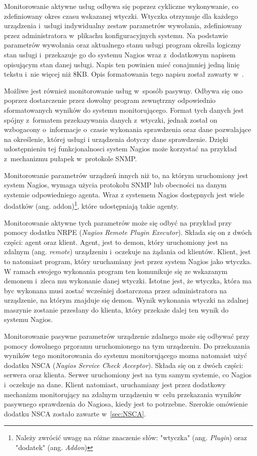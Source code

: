 Monitorowanie aktywne usług odbywa się poprzez cykliczne wykonywanie,
co zdefiniowany okres czasu wskazanej wtyczki. Wtyczka otrzymuje dla
każdego urządzenia i~usługi indywidualny zestaw parametrów wywołania,
zdefiniowany przez administratora w~plikachu konfiguracyjnych
systemu. Na podstawie parametrów wywołania oraz aktualnego stanu
usługi program określa logiczny stan usługi i~przekazuje go do systemu
Nagios wraz z~dodatkowym napisem opisującym stan danej usługi. Napis
ten powinien mieć conajmniej jedną linię tekstu i~nie więcej niż
8KB. Opis formatowania tego napisu został zawarty
w~\cite{www:NagiosPluginsTutorial}. 

Możliwe jest również monitorowanie usług w~sposób pasywny. Odbywa się
ono poprzez dostarczenie przez dowolny program zewnętrzny odpowiednio
sformatowanych wyników do systemu monitorującego. Format tych danych
jest spójny z~formatem przekazywania danych z~wtyczki, jednak został
on wzbogacony o~informacje o~czasie wykonania sprawdzenia oraz dane
pozwalające na określenie, której usługi i urządzenia dotyczy dane
sprawdzenie. Dzięki udostępnieniu tej funkcjonalnosci system Nagios
może korzystać na przykład z~mechanizmu pułapek w~protokole SNMP.

Monitorowanie parametrów urządzeń innych niż to, na którym uruchomiony
jest system Nagios, wymaga użycia protokołu SNMP lub obecności na
danym systemie odpowiedniego agenta. Wraz z systemem Nagios dostępnych
jest wiele dodatków (ang. addon)\footnote{Należy zwrócić uwagę na
  różne znaczenie słów: "wtyczka" (ang. {\em Plugin}) oraz "dodatek"
  (ang. {\em Addon})}, które udostępniają takie agenty.

Monitorowanie aktywne tych parametrów może się odbyć na przykład przy
pomocy dodatku NRPE ({\em Nagios Remote Plugin Executor}). Składa się
on z dwóch części: agent oraz klient. Agent, jest to demon, który
uruchomiony jest na zdalnym (ang. {\em remote}) urządzeniu i~oczekuje
na żądania od klientów. Klient, jest to natomiast program, który
uruchamiany jest przez system Nagios jako wtyczka. W ramach swojego
wykonania program ten komunikuje się ze wskazanym demonem i~zleca mu
wykonanie danej wtyczki. Istotne jest, że wtyczka, która ma byc
wykonana musi zostać wcześniej dostarczona przez administratora na
urządzenie, na którym znajduje się demon. Wynik wykonania wtyczki na
zdalnej maszynie zostanie przesłany do klienta, który przekaże dalej
ten wynik do systemu Nagios.

Monitorowanie pasywne parametrów urządzenie zdalnego może się odbywać
przy pomocy dowolnego prgoramu uruchomionego na tym urządzeniu. Do
przekazania wyników tego monitorowania do systemu monitorującego mozna
natomaist użyć dodatku NSCA ({\em Nagios Service Check
  Acceptor}). Składa się on z dwóch części: serwera oraz
klienta. Serwer uruchomiony jest na tym samym systemie, co Nagios
i~oczekuje na dane. Klient natomiast, uruchamiany jest przez dodatkowy
mechanizm monitorujący na zdalnym urządzeniu w~celu przekazania
wyników pasywnego sprawdzenia do Nagiosa, kiedy jest to
potrzebne. Szerokie omówienie dodatku NSCA zostało zawarte
w~\ref{sec:NSCA}.

